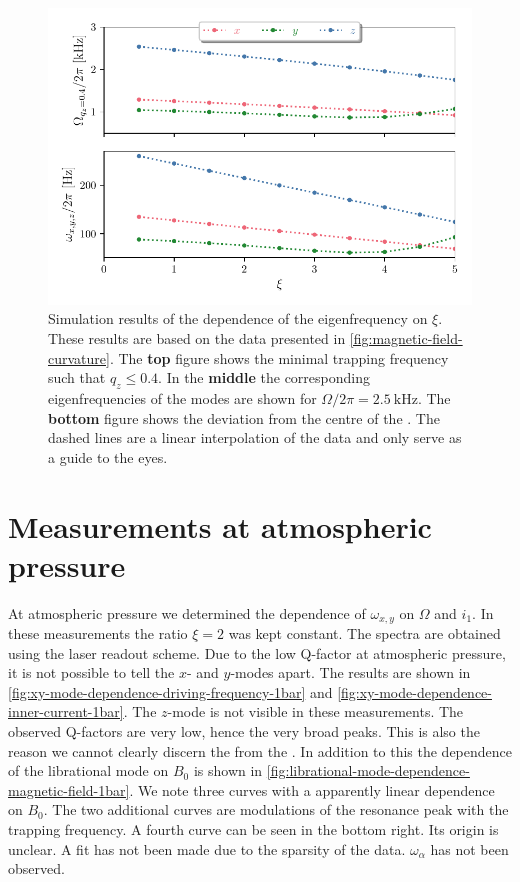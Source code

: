 \begin{figure}
    \centering
    \includegraphics{figures/data/eigen_frequency_xi_dependence.pdf}
    \caption{Simulation results of the dependence of the eigenfrequency on $\xi$. These results are based on the data presented in \autoref{fig:magnetic-field-curvature}. The \textbf{top} figure shows the minimal trapping frequency such that $q_z \leq 0.4$. In the \textbf{middle} the corresponding eigenfrequencies of the modes are shown for $\Omega / 2\pi = \qty{2.5}{\kilo\hertz}$. The \textbf{bottom} figure shows the deviation from the centre of the \ymode. The dashed lines are a linear interpolation of the data and only serve as a guide to the eyes.}
    \label{fig:eigen-frequency-xi-dependence}
\end{figure}

\section{Measurements at atmospheric pressure}
\label{sec:measurements-at-atmospheric-pressure}
At atmospheric pressure we determined the dependence of $\omega_{x,y}$ on $\Omega$ and $i_1$. In these measurements the ratio $\xi=2$ was kept constant. The spectra are obtained using the laser readout scheme. Due to the low Q-factor at atmospheric pressure, it is not possible to tell the $x$- and $y$-modes apart. The results are shown in \autoref{fig:xy-mode-dependence-driving-frequency-1bar} and \autoref{fig:xy-mode-dependence-inner-current-1bar}. The $z$-mode is not visible in these measurements. The observed Q-factors are very low, hence the very broad peaks. This is also the reason we cannot clearly discern the \xmode from the \ymode. In addition to this the dependence of the librational mode on $B_0$ is shown in \autoref{fig:librational-mode-dependence-magnetic-field-1bar}. We note three curves with a apparently linear dependence on $B_0$. The two additional curves are modulations of the resonance peak with the trapping frequency. A fourth curve can be seen in the bottom right. Its origin is unclear. A fit has not been made due to the sparsity of the data. $\omega_\alpha$ has not been observed.

